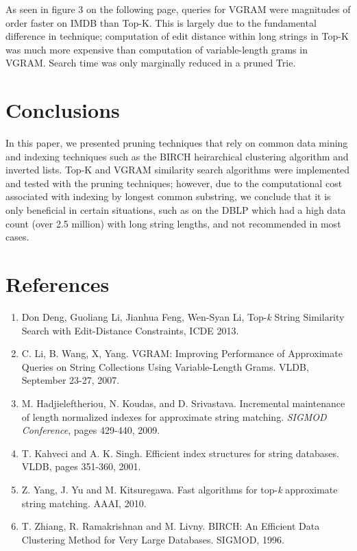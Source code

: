 \documentclass[pdftex,12pt,letter]{article}
\begin{document}
As seen in figure 3 on the following page, queries for VGRAM were magnitudes of order faster on IMDB than Top-K. This is largely due to the fundamental difference in technique; computation of edit distance within long strings in Top-K was much more expensive than computation of variable-length grams in VGRAM. Search time was only marginally reduced in a pruned Trie.

\section{Conclusions}
In this paper, we presented pruning techniques that rely on common data mining and indexing techniques such as the BIRCH heirarchical clustering algorithm and inverted lists. Top-K and VGRAM similarity search algorithms were implemented and tested with the pruning techniques; however, due to the computational cost associated with indexing by longest common substring, we conclude that it is only beneficial in certain situations, such as on the DBLP which had a high data count (over 2.5 million) with long string lengths, and not recommended in most cases.

\section{References}
\begin{enumerate}
\item Don Deng, Guoliang Li, Jianhua Feng, Wen-Syan Li, Top-\textit{k} String Similarity Search with Edit-Distance Constraints, ICDE 2013.
\item C. Li, B. Wang, X, Yang. VGRAM: Improving Performance of Approximate Queries on String Collections Using Variable-Length Grams. VLDB, September 23-27, 2007.
\item M. Hadjieleftheriou, N. Koudas, and D. Srivastava. Incremental maintenance of length normalized indexes for approximate string matching. \textit{SIGMOD Conference}, pages 429-440, 2009.
\item T. Kahveci and A. K. Singh. Efficient index structures for string databases. VLDB, pages 351-360, 2001.
\item Z. Yang, J. Yu and M. Kitsuregawa. Fast algorithms for top-\textit{k} approximate string matching. AAAI, 2010.
\item T. Zhiang, R. Ramakrishnan and M. Livny. BIRCH: An Efficient Data Clustering Method for Very Large Databases. SIGMOD, 1996.
\end{enumerate}

\FloatBarrier
\end{document}
